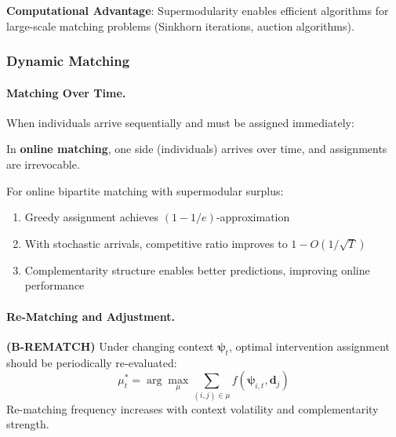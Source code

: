 \textbf{Computational Advantage}: Supermodularity enables efficient algorithms for 
large-scale matching problems (Sinkhorn iterations, auction algorithms).

\subsubsection{Dynamic Matching}

\paragraph{Matching Over Time.}

When individuals arrive sequentially and must be assigned immediately:

\begin{definition}
\label{def:online}
In \textbf{online matching}, one side (individuals) arrives over time, and 
assignments are irrevocable.
\end{definition}

\begin{proposition}
\label{prop:competitive}
For online bipartite matching with supermodular surplus:
\begin{enumerate}
    \item Greedy assignment achieves $(1 - 1/e)$-approximation
    \item With stochastic arrivals, competitive ratio improves to $1 - O(1/\sqrt{T})$
    \item Complementarity structure enables better predictions, improving online performance
\end{enumerate}
\end{proposition}

\paragraph{Re-Matching and Adjustment.}

\begin{axiom}
\label{ax:B-REMATCH}
\textbf{(B-REMATCH)} Under changing context $\boldsymbol{\psi}_t$, optimal intervention 
assignment should be periodically re-evaluated:
\begin{equation}
\mu_t^* = \arg\max_{\mu} \sum_{(i,j) \in \mu} f(\boldsymbol{\psi}_{i,t}, \mathbf{d}_j)
\end{equation}
Re-matching frequency increases with context volatility and complementarity strength.
\end{axiom}

